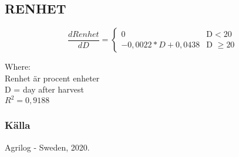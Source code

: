 \documentclass[fleqn]{article}
\begin{document}
\subsection{RENHET}

\begin{equation}
\frac{dRenhet}{dD} =
\begin{cases}
0 & \text{D} < 20\\
-0,0022*D + 0,0438 & \text{D $\geq 20$}
\end{cases}
\end{equation}

Where:\\
\hangindent=1.5cm
Renhet är procent enheter\\
D = day after harvest\\
$R^2 = 0,9188$

\subsubsection{Källa}
Agrilog - Sweden, 2020. 
\end{document}
